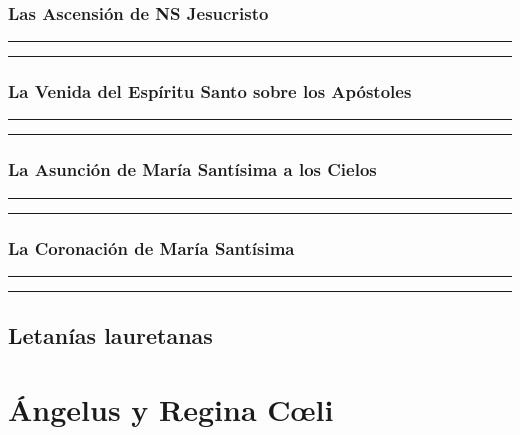 \documentclass[11pt,a4paper]{report}
\begin{document}
    \subsubsection*{Las Ascensión de NS Jesucristo}
    
    
    \rule{\textwidth}{0.5pt}
    
    \rule{\textwidth}{0.5pt}
    

    \subsubsection*{La Venida del Espíritu Santo sobre los Apóstoles}
    
    
    \rule{\textwidth}{0.5pt}
    
    \rule{\textwidth}{0.5pt}
    

    \subsubsection*{La Asunción de María Santísima a los Cielos}
    
    
    \rule{\textwidth}{0.5pt}
    
    \rule{\textwidth}{0.5pt}
    

    \subsubsection*{La Coronación de María Santísima}
    
    
    \rule{\textwidth}{0.5pt}
    
    \rule{\textwidth}{0.5pt}
    

    

    \subsection*{Letanías lauretanas}
    

    \section*{Ángelus y Regina Cœli}
    
\end{document}
